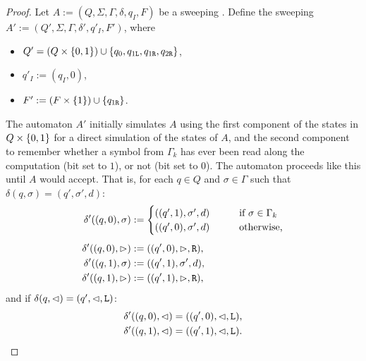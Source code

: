 \begin{proof}
	\newcommand{\ql}{q_{1\mathtt{L}}}
	\newcommand{\qr}{q_{1\mathtt{R}}}
	\newcommand{\qqr}{q_{2\mathtt{R}}}

	Let $A:=(Q,\Sigma,\Gamma,\delta,q_I,F)$ be a sweeping \kDLA.
	Define the sweeping \kDLA $A':=(Q',\Sigma,\Gamma,\delta',q'_I,F')$, where
	\begin{itemize}
		\item $Q'=(Q\times\set{0,1})\cup\set{q_0,\ql,\qr,\qqr}$,
		\item $q'_I:=(q_I,0)$,
		\item $F':=(F\times\set{1})\cup\set{\qr}$.
	\end{itemize}

	The automaton $A'$ initially simulates $A$ using the first component of the states in $Q\times\{0,1\}$ for a direct simulation of the states of $A$, and the second component to remember whether a symbol from $\Gamma_k$ has ever been read along the computation (bit set to $1$), or not (bit set to $0$).
	The automaton proceeds like this until $A$ would accept.
	That is, for each $q\in Q$ and $\sigma\in\Gamma$ such that $\delta(q,\sigma)=(q',\sigma',d)$:
	\begin{align*}
		\delta'((q,0),\sigma) & :=\begin{cases}
			                          ((q',1),\sigma',d) \qquad & \text{if }\sigma\in\Gamma_k \\
			                          ((q',0),\sigma',d) \qquad & \text{otherwise,}
		                          \end{cases} \\[1ex]
		\delta'((q,0),\rhd)   & :=((q',0),\rhd,\mathtt R) \text,                                \\
		\delta'((q,1),\sigma) & :=((q',1),\sigma',d) \text,                               \\
		\delta'((q,1),\rhd)   & :=((q',1),\rhd,\mathtt R) \text,
	\end{align*}
	and if $\delta(q,\lhd)=(q',\lhd,\mathtt L)$:
	\begin{align*}
		\delta'((q,0),\lhd) & =((q',0),\lhd,\mathtt L) \text, \\
		\delta'((q,1),\lhd) & =((q',1),\lhd,\mathtt L) \text.
	\end{align*}


\end{proof}
